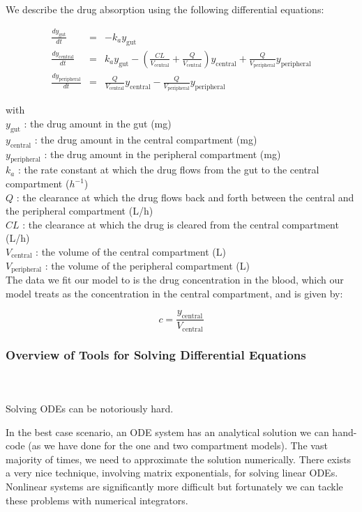 \documentclass[11pt]{amsart}
\begin{document}
We describe the drug absorption using the following differential equations:

\begin{eqnarray*}
  \frac{dy_{\mathrm{gut}}}{dt} &=& -k_a y_{\mathrm{gut}} \\
  \frac{dy_{\mathrm{central}}}{dt} &=& k_a y_{\mathrm{gut}} - (\frac{CL}{V_{\mathrm{central}}} + \frac{Q}{V_{\mathrm{central}}}) y_{\mathrm{central}} +  \frac{Q}{V_{\mathrm{peripheral}}} y_{\mathrm{peripheral}} \\
\frac{dy_{\mathrm{peripheral}}}{dt} &=& \frac{Q}{V_{\mathrm{central}}} y_{\mathrm{central}} - \frac{Q}{V_{\mathrm{peripheral}}} y_{\mathrm{peripheral}}
\end{eqnarray*}

with \\  
$y_{\mathrm{gut}}$ : the drug amount in the gut (mg)  \\
$y_{\mathrm{central}}$ : the drug amount in the central compartment (mg)  \\
$y_{\mathrm{peripheral}}$ : the drug amount in the peripheral compartment (mg)  \\
$k_a$ : the rate constant at which the drug flows from the gut to the central compartment ($h^{-1}$)  \\
$Q$ : the clearance at which the drug flows back and forth between the central and the peripheral compartment (L/h) \\ 
$CL$ : the clearance at which the drug is cleared from the central compartment (L/h)  \\
$V_{\mathrm{central}}$ : the volume of the central compartment (L)  \\
$V_{\mathrm{peripheral}}$ : the volume of the peripheral compartment (L) \\

The data we fit our model to is the drug concentration in the blood, which our model treats as the concentration in the central compartment, and is given by:

$$ c = \frac{y_{\mathrm{central}}}{V_{\mathrm{central}}} $$

\subsubsection{Overview of Tools for Solving Differential Equations} \ \\ \ \\
Solving ODEs can be notoriously hard.

In the best case scenario, an ODE system has an analytical solution we can hand-code (as we have done for the one and two compartment models). The vast majority of times, we need to approximate the solution numerically. There exists a very nice technique, involving matrix exponentials, for solving linear ODEs. Nonlinear systems are significantly more difficult but fortunately we can tackle these problems with numerical integrators.
\end{document}
